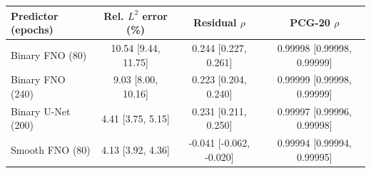 \begin{tabular}{@{}lccc@{}}
\toprule
Predictor (epochs) & Rel. $L^2$ error (\%) & Residual $\rho$ & PCG-20 $\rho$ \\
\midrule
Binary FNO (80) & 10.54 [9.44, 11.75] & 0.244 [0.227, 0.261] & 0.99998 [0.99998, 0.99999] \\
Binary FNO (240) & 9.03 [8.00, 10.16] & 0.223 [0.204, 0.240] & 0.99999 [0.99998, 0.99999] \\
Binary U-Net (200) & 4.41 [3.75, 5.15] & 0.231 [0.211, 0.250] & 0.99997 [0.99996, 0.99998] \\
Smooth FNO (80) & 4.13 [3.92, 4.36] & -0.041 [-0.062, -0.020] & 0.99994 [0.99994, 0.99995] \\
\bottomrule
\end{tabular}

